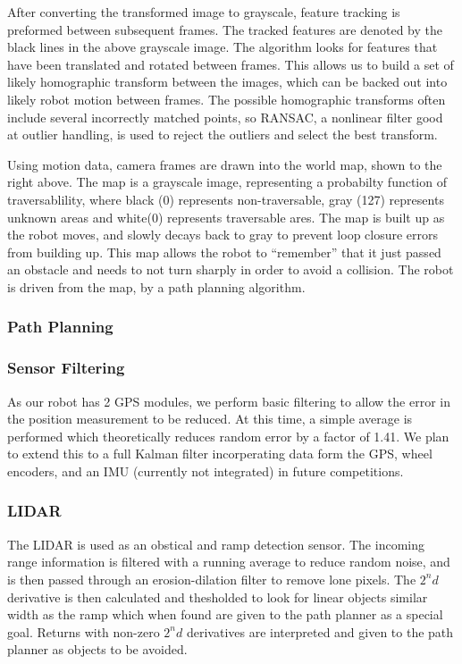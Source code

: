After converting the transformed image to grayscale, feature tracking is preformed between subsequent frames. The tracked features are denoted by the black lines in the above grayscale image. The algorithm looks for features that have been translated and rotated between frames. This allows us to build a set of likely homographic transform between the images, which can be backed out into likely robot motion between frames. The possible homographic transforms often include several incorrectly matched points, so RANSAC, a nonlinear filter good at outlier handling, is used to reject the outliers and select the best transform.

Using motion data, camera frames are drawn into the world map, shown to the right above. The map is a grayscale image, representing a probabilty function of traversablility, where black (0) represents non-traversable, gray (127) represents unknown areas and white(0) represents traversable ares. The map is built up as the robot moves, and slowly decays back to gray to prevent loop closure errors from building up. This map allows the robot to “remember” that it just passed an obstacle and needs to not turn sharply in order to avoid a collision. The robot is driven from the map, by a path planning algorithm.

\subsubsection{Path Planning}

\subsubsection{Sensor Filtering}

As our robot has 2 GPS modules, we perform basic filtering to allow the error in the position measurement to be reduced. At this time, a simple average is performed which theoretically reduces random error by a factor of 1.41. We plan to extend this to a full Kalman filter incorperating data form the GPS, wheel encoders, and an IMU (currently not integrated) in future competitions.

\subsubsection{LIDAR}

The LIDAR is used as an obstical and ramp detection sensor. The incoming range information is filtered with a running average to reduce random noise, and is then passed through an erosion-dilation filter to remove lone pixels. The $2^nd$ derivative is then calculated and thesholded to look for linear objects similar width as the ramp which when found are given to the path planner as a special goal. Returns with non-zero $2^nd$ derivatives are interpreted and given to the path planner as objects to be avoided.